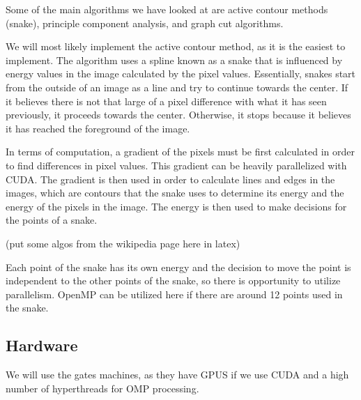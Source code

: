\documentclass[12pt]{article}
\begin{document}
Some of the main algorithms we have looked at are active contour methods
(snake), principle component analysis, and graph cut algorithms.

We will most likely implement the active contour method, as it is the easiest
to implement. The algorithm uses a spline known as a snake that is influenced
by energy values in the image calculated by the pixel values. Essentially,
snakes start from the outside of an image as a line and try to continue towards
the center. If it believes there is not that large of a pixel difference with
what it has seen previously, it proceeds towards the center. Otherwise, it
stops because it believes it has reached the foreground of the image.

In terms of computation, a gradient of the pixels must be first calculated in
order to find differences in pixel values. This gradient can be heavily parallelized with
CUDA. The gradient is then used in order to calculate lines and edges in the
images, which are contours that the snake uses to determine its energy and
the energy of the pixels in the image. The energy is then used to make
decisions for the points of a snake.

(put some algos from the wikipedia page here in latex)
\cite{contour-model}

Each point of the snake has its own energy and the decision to move the point
is independent to the other points of the snake, so there is opportunity to
utilize parallelism. OpenMP can be utilized here if there are around 12 points
used in the snake.

\subsection*{Hardware}
We will use the gates machines, as they have GPUS if we use CUDA and a high
number of hyperthreads for OMP processing.

\end{document}
